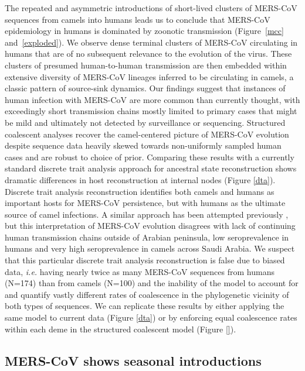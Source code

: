 \documentclass[11pt,oneside,letterpaper]{article}
\begin{document}
The repeated and asymmetric introductions of short-lived clusters of MERS-CoV sequences from camels into humans leads us to conclude that MERS-CoV epidemiology in humans is dominated by zoonotic transmission (Figure~\ref{mcc} and~\ref{exploded}).
We observe dense terminal clusters of MERS-CoV circulating in humans that are of no subsequent relevance to the evolution of the virus.
These clusters of presumed human-to-human transmission are then embedded within extensive diversity of MERS-CoV lineages inferred to be circulating in camels, a classic pattern of source-sink dynamics.
Our findings suggest that instances of human infection with MERS-CoV are more common than currently thought, with exceedingly short transmission chains mostly limited to primary cases that might be mild and ultimately not detected by surveillance or sequencing.
Structured coalescent analyses recover the camel-centered picture of MERS-CoV evolution despite sequence data heavily skewed towards non-uniformly sampled human cases and are robust to choice of prior.
Comparing these results with a currently standard discrete trait analysis \citep{lemey_bayesian_2009} approach for ancestral state reconstruction shows dramatic differences in host reconstruction at internal nodes (Figure \ref{dta}).
Discrete trait analysis reconstruction identifies both camels and humans as important hosts for MERS-CoV persistence, but with humans as the ultimate source of camel infections.
A similar approach has been attempted previously \citep{zhang_evolutionary_2016}, but this interpretation of MERS-CoV evolution disagrees with lack of continuing human transmission chains outside of Arabian peninsula, low seroprevalence in humans and very high seroprevalence in camels across Saudi Arabia.
We suspect that this particular discrete trait analysis reconstruction is false due to biased data, \textit{i.e.} having nearly twice as many MERS-CoV sequences from humans (N=174) than from camels (N=100) and the inability of the model to account for and quantify vastly different rates of coalescence in the phylogenetic vicinity of both types of sequences.
We can replicate these results by either applying the same model to current data (Figure \ref{dta}) or by enforcing equal coalescence rates within each deme in the structured coalescent model (Figure \ref{}).


\subsection*{MERS-CoV shows seasonal introductions}
\end{document}
